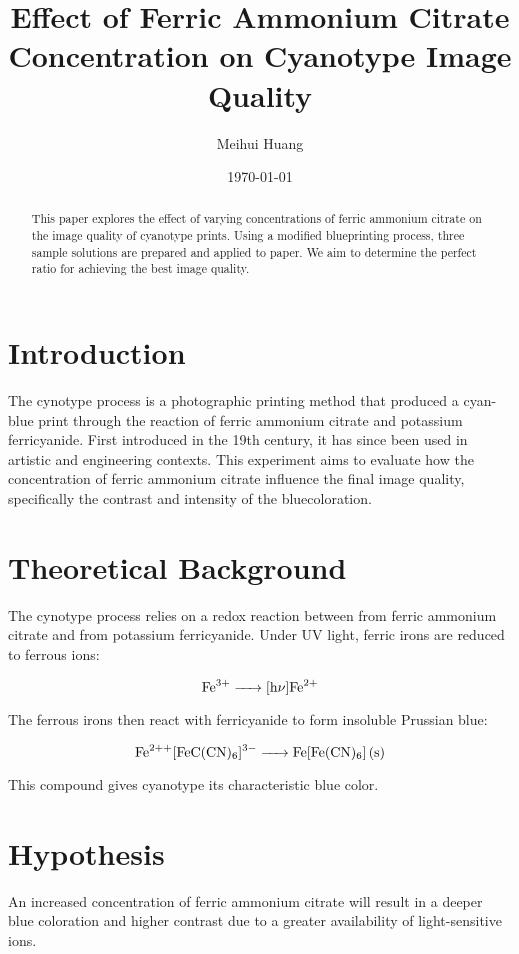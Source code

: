 \documentclass[a4paper,12pt]{article}
\title{Effect of Ferric Ammonium Citrate Concentration on Cyanotype Image Quality}
\author{Meihui Huang}
\date{\today}
\begin{document}
\maketitle

\begin{abstract}
This paper explores the effect of varying concentrations of ferric ammonium citrate on the image quality of cyanotype prints. Using a modified blueprinting process, three sample solutions are prepared and applied to paper. We aim to determine the perfect ratio for achieving the best image quality.
\end{abstract}

\section{Introduction}
The cynotype process is a photographic printing method that produced a cyan-blue print through the reaction of ferric ammonium citrate and potassium ferricyanide. First introduced in the 19th century, it has since been used in artistic and engineering contexts. This experiment aims to evaluate how the concentration of ferric ammonium citrate influence the final image quality, specifically the contrast and intensity of the bluecoloration.

\section{Theoretical Background}
The cynotype process relies on a redox reaction between  from ferric ammonium citrate and  from potassium ferricyanide. Under UV light, ferric irons are reduced to ferrous ions:

\begin{equation}
\ce{Fe^{3+} -> [h\nu]Fe^{2+}}
\end{equation}

The ferrous irons then react with ferricyanide to form insoluble Prussian blue:

\begin{equation}
\ce{Fe^{2+}+[FeC(CN)6]^{3-} -> Fe[Fe(CN)6] (s)} 
\end{equation}

This compound gives cyanotype its characteristic blue color.

\section{Hypothesis}
An increased concentration of ferric ammonium citrate will result in a deeper blue coloration and higher contrast due to a greater availability of light-sensitive  ions.
\end{document}
